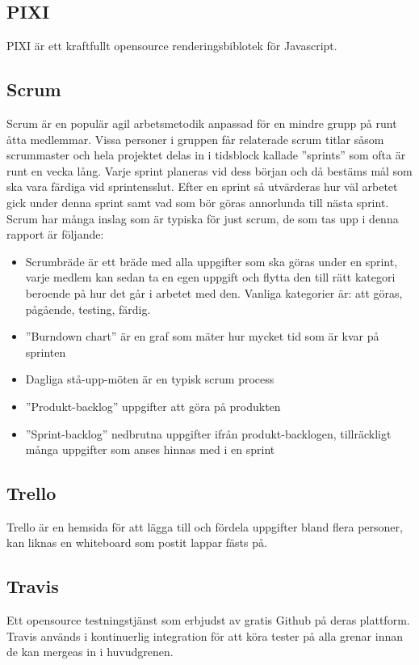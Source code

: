 \subsection*{PIXI}
PIXI är ett kraftfullt opensource renderingsbiblotek för Javascript.

\subsection*{Scrum}
Scrum är en populär agil arbetsmetodik anpassad för en mindre grupp på runt åtta medlemmar. Vissa personer i gruppen får relaterade scrum titlar såsom scrummaster och hela projektet delas in i tidsblock kallade ''sprints'' som ofta är runt en vecka lång. Varje sprint planeras vid dess början och då bestäms mål som ska vara färdiga vid sprintensslut. Efter en sprint så utvärderas hur väl arbetet gick under denna sprint samt vad som bör göras annorlunda till nästa sprint. Scrum har många inslag som är typiska för just scrum, de som tas upp i denna rapport är följande:

\begin{itemize}
	\item Scrumbräde är ett bräde med alla uppgifter som ska göras under en sprint, varje medlem kan sedan ta en egen uppgift och flytta den till rätt kategori beroende på hur det går i arbetet med den. Vanliga kategorier är: att göras, pågående, testing, färdig.
	\item ''Burndown chart'' är en graf som mäter hur mycket tid som är kvar på sprinten
	\item Dagliga stå-upp-möten är en typisk scrum process
	\item ''Produkt-backlog'' uppgifter att göra på produkten
	\item ''Sprint-backlog'' nedbrutna uppgifter ifrån produkt-backlogen, tillräckligt många uppgifter som anses hinnas med i en sprint
\end{itemize}

\subsection*{Trello}
Trello är en hemsida för att lägga till och fördela uppgifter bland flera personer, kan liknas en whiteboard som postit lappar fästs på.


\subsection*{Travis}
Ett opensource testningstjänst som erbjudst av gratis Github på deras plattform. Travis används i kontinuerlig integration för att köra tester på alla grenar innan de kan mergeas in i huvudgrenen.

